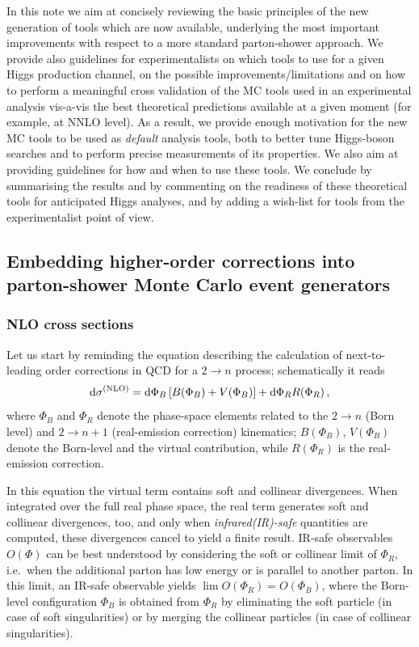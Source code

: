 In this note we aim at concisely reviewing the basic principles of the new 
generation of tools which are now available, underlying the most important 
improvements with respect to a more standard parton-shower approach.  We 
provide also guidelines for experimentalists on which tools to use for a 
given Higgs production channel, on the possible improvements/limitations and 
on how to perform a meaningful cross validation of the MC tools used in an 
experimental analysis vis-a-vis the best theoretical predictions available 
at a given moment (for example, at NNLO level).  As a result, we provide 
enough motivation for the new MC tools to be used as {\em default} analysis 
tools, both to better tune Higgs-boson searches and to perform precise 
measurements of its properties.  We also aim at providing guidelines for
how and when to use these tools.  We conclude by summarising the results 
and by commenting on the readiness of these theoretical tools for 
anticipated 
Higgs analyses, and by adding a wish-list for tools from the experimentalist 
point of view.   

\subsection{Embedding higher-order corrections into parton-shower
  Monte Carlo event generators}
\subsubsection{NLO cross sections}

Let us start by reminding the equation describing the calculation of 
next-to-leading order corrections in QCD for a $2\to n$ process; 
schematically it reads
\begin{equation}\label{eq:nlocorr}
{\rm d}\sigma^{\rm (NLO)}
=
{\rm d}\Phi_B\left[B(\Phi_B)+V(\Phi_B)\right]+
{\rm d}\Phi_R R(\Phi_R)\,,
\end{equation}
where $\Phi_B$ and $\Phi_R$ denote the phase-space elements related to the
$2\to n$ (Born level) and $2\to n+1$ (real-emission correction) kinematics;
$B(\Phi_B)$, $V(\Phi_B)$ denote the Born-level and the virtual contribution, 
while $R(\Phi_R)$ is the real-emission correction.

In this equation the virtual term contains soft and collinear divergences.
When integrated over the full real phase space, the real term generates 
soft and collinear divergences, too, and only when {\em infrared(IR)-safe} 
quantities are computed, these divergences cancel to yield a finite result.
IR-safe observables $O(\Phi)$ can be best understood by considering
the soft or collinear limit of $\Phi_R$, i.e.\ when the additional parton
has low energy or is parallel to another parton.  In this
limit, an IR-safe observable yields $\lim O(\Phi_R)=O(\Phi_B)$, where the 
Born-level configuration $\Phi_B$ is obtained from $\Phi_R$ by eliminating 
the soft particle (in case of soft singularities) or by merging the collinear 
particles (in case of collinear singularities).


